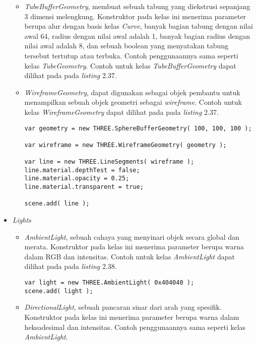 \begin{itemize}
\begin{itemize}
	\item {\it TubeBufferGeometry},  membuat sebuah tabung yang diekstrusi sepanjang 3 dimensi melengkung. Konstruktor pada kelas ini menerima parameter berupa alur dengan basis kelas {\it Curve}, banyak bagian tabung dengan nilai awal 64, radius dengan nilai awal adalah 1, banyak bagian radius dengan nilai awal adalah 8, dan sebuah boolean yang menyatakan tabung tersebut tertutup atau terbuka. Contoh penggunaannya sama seperti kelas {\it TubeGeometry}. Contoh untuk kelas {\it TubeBufferGeometry} dapat dilihat pada pada {\it listing} 2.37.
	
	\item {\it WireframeGeometry}, dapat digunakan sebagai objek pembantu untuk menampilkan sebuah objek geometri sebagai {\it wireframe}. Contoh untuk kelas {\it WireframeGeometry} dapat dilihat pada pada {\it listing} 2.37.
	
\begin{lstlisting}[caption={Contoh penggunaan kelas {\it WireframeGeometry}.},captionpos=b]
var geometry = new THREE.SphereBufferGeometry( 100, 100, 100 );

var wireframe = new THREE.WireframeGeometry( geometry );

var line = new THREE.LineSegments( wireframe );
line.material.depthTest = false;
line.material.opacity = 0.25;
line.material.transparent = true;

scene.add( line );
\end{lstlisting}

	\end{itemize}
	
\item \textit{Lights}

	\begin{itemize}
	\item {\it AmbientLight}, sebuah cahaya yang menyinari objek secara global dan merata. Konstruktor pada kelas ini menerima parameter berupa warna dalam RGB dan intensitas. Contoh untuk kelas {\it AmbientLight} dapat dilihat pada pada {\it listing} 2.38.
	
\begin{lstlisting}[caption={Contoh penggunaan kelas {\it AmbientLight}.},captionpos=b]
var light = new THREE.AmbientLight( 0x404040 ); 
scene.add( light );
\end{lstlisting}
	
	\item {\it DirectionalLight}, sebuah pancaran sinar dari arah yang spesifik. Konstruktor pada kelas ini menerima parameter berupa warna dalam heksadesimal dan intensitas. Contoh penggunaannya sama seperti kelas {\it AmbientLight}.


\end{itemize}
\end{itemize}
